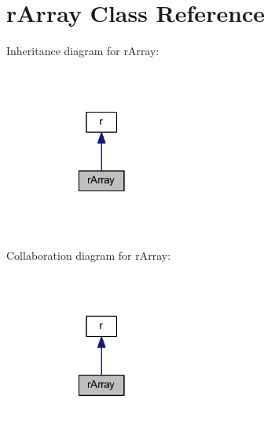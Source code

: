 \hypertarget{class_pierce_moore_1_1_ruby_p_h_p_1_1r_array}{\section{r\-Array Class Reference}
\label{class_pierce_moore_1_1_ruby_p_h_p_1_1r_array}
}


Inheritance diagram for r\-Array\-:
\nopagebreak
\begin{figure}[H]
\begin{center}
\leavevmode
\includegraphics[width=122pt]{class_pierce_moore_1_1_ruby_p_h_p_1_1r_array__inherit__graph}
\end{center}
\end{figure}


Collaboration diagram for r\-Array\-:
\nopagebreak
\begin{figure}[H]
\begin{center}
\leavevmode
\includegraphics[width=122pt]{class_pierce_moore_1_1_ruby_p_h_p_1_1r_array__coll__graph}
\end{center}
\end{figure}

